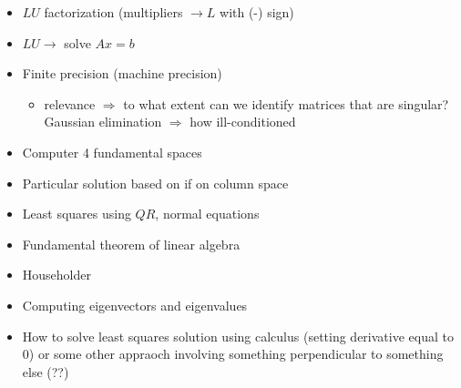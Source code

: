 \begin{itemize}
  \item $LU$ factorization (multipliers $\rightarrow L$ with (-) sign)
  \item $LU \rightarrow$ solve $Ax = b$
  \item Finite precision (machine precision)
  \begin{itemize}
    \item relevance $\Rightarrow$ to what extent can we identify matrices that are singular? Gaussian elimination $\Rightarrow$ how ill-conditioned
  \end{itemize}
  \item Computer 4 fundamental spaces
  \item Particular solution based on if on column space
  \item Least squares using $QR$, normal equations
  \item Fundamental theorem of linear algebra
  \item Householder
  \item Computing eigenvectors and eigenvalues
  \item How to solve least squares solution using calculus (setting derivative equal to 0) or some other appraoch involving something perpendicular to something else (??)
\end{itemize}